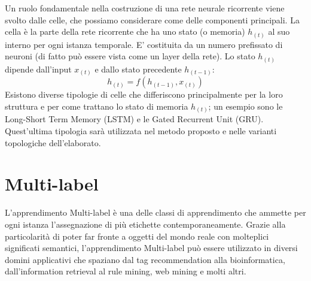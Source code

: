 Un ruolo fondamentale nella costruzione di una rete neurale ricorrente viene svolto dalle celle, che possiamo considerare come delle componenti principali. La cella è la parte della rete ricorrente che ha uno stato (o memoria) $h_{(t)}$ al suo interno per ogni istanza temporale. E' costituita da un numero prefissato di neuroni (di fatto può essere vista come un layer della rete). Lo stato $h_{(t)}$ dipende dall'input $x_{(t)}$ e dallo stato precedente $h_{(t-1)}$:
\begin{equation}
	h_{(t)} = f(h_{(t-1)}, x_{(t)})
\end{equation}
Esistono diverse tipologie di celle che differiscono principalmente per la loro struttura e per come trattano lo stato di memoria $h_{(t)}$; un esempio sono le Long-Short Term Memory (LSTM) e le Gated Recurrent Unit (GRU). Quest'ultima tipologia sarà utilizzata nel metodo proposto e nelle varianti topologiche dell'elaborato.

\begin{comment}
L'oggetto principale del presente studio è stata la modifica della topologia di due reti neurali artificiali, nello specifico di una rete neurale ricorrente (in inglese \textit{Recurrent Neural Netowrk} o abbreviato RNN) con cella GRU (Gated Recurrent Unit) e di una TCN (Temporal Convolutional Neural Network). Un altro argomento presente è stata la trattazione di diverse \textit{feature transform} per la gestione di un dataset altamente sparso.

La stesura di questo elaborato è stata articolata in quattro capitoli. Inizialmente, verranno brevemente esposti alcuni concetti teorici rilevanti nel contesto delle modifiche svolte. La trattazione proseguirà con la presentazione delle modifiche effettuate e delle feature trasform individuate e le relative performance. Infine, verranno tratte delle conclusioni riguardo il lavoro svolto.

Tutto il codice sviluppato il relazione a questo lavoro è stato scritto in MATLAB, un ambiente per il calcolo numerico e l'analisi statistica scritto in linguaggio di programmazione C.
\end{comment}

\section{Multi-label}
L'apprendimento Multi-label è una delle classi di apprendimento che ammette per ogni istanza l'assegnazione di più etichette contemporaneamente. Grazie alla particolarità di poter far fronte a oggetti del mondo reale con molteplici significati semantici, l'apprendimento Multi-label può essere utilizzato in diversi domini applicativi che spaziano dal tag recommendation alla bioinformatica, dall'information retrieval al rule mining, web mining e molti altri.

